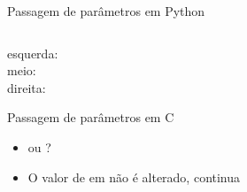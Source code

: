 \documentclass{beamer}
\begin{document}
\begin{frame}[<+->]{Passagem de parâmetros em Python}

  \begin{columns}
    \begin{column}[t]{0.33\linewidth}
      
    \end{column}
    \begin{column}[t]{0.33\linewidth}
      
    \end{column}
    \begin{column}[t]{0.33\linewidth}
      
    \end{column}
  \end{columns}

  \bigskip

  \begin{description}
    \item[esquerda:] 
    \item[meio:] \coda{[1, 2, 3]}
    \item[direita:] \coda{[1, 2]}
  \end{description}
\end{frame}

\begin{frame}[<+->]{Passagem de parâmetros em C}
  \action{}

  \bigskip

  \begin{itemize}
    \item \alert{} ou \alert{}?
  \end{itemize}

  \bigskip

  \begin{itemize}
    \item O valor de \alert{} em \alert{} não é alterado, continua \alert{}
  \end{itemize}
\end{frame}
\end{document}
